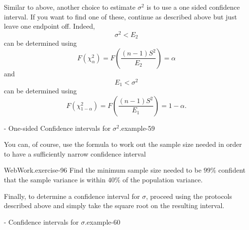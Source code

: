 \documentclass[10pt,]{book}
\numberwithin{equation}{section}
\newcommand{\lt}{<}
\begin{document}
%
\par
\hypertarget{p-1420}{}%
Similar to above, another choice to estimate \(\sigma ^2\) is to use a one sided confidence interval. If you want to find one of these, continue as described above but just leave one endpoint off.  Indeed,%
\begin{equation*}
\sigma^2 \lt E_2
\end{equation*}
can be determined using%
\begin{equation*}
F(\chi^2_{\alpha} ) = F \left ( \frac{(n-1)S^2}{E_2} \right ) = \alpha
\end{equation*}
and%
\begin{equation*}
E_1 \lt \sigma^2 
\end{equation*}
can be determined using%
\begin{equation*}
F(\chi^2_{1-\alpha} ) = F \left ( \frac{(n-1)S^2}{E_1} \right ) = 1 - \alpha.
\end{equation*}
\begin{example}{- One-sided Confidence intervals for \(\sigma^2\).}{example-59}%
\hypertarget{p-1421}{}%
%
\end{example}
%
\par
\hypertarget{p-1422}{}%
You can, of course, use the formula to work out the sample size needed in order to have a sufficiently narrow confidence interval%
\par
\hypertarget{p-1423}{}%
\begin{inlineexercise}{WebWork.}{exercise-96}%
\hypertarget{p-1424}{}%
Find the minimum sample size needed to be \(99\)\%  confident that the sample variance is within \(40\)\% of the population variance.%
\end{inlineexercise}
%
\par
\hypertarget{p-1426}{}%
Finally, to determine a confidence interval for \(\sigma\), proceed using the protocols described above and simply take the square root on the resulting interval. \begin{example}{- Confidence intervals for \(\sigma\).}{example-60}%
\hypertarget{p-1427}{}%
%
\end{example}
%
%
%
\typeout{************************************************}
\typeout{************************************************}
%
\end{document}
